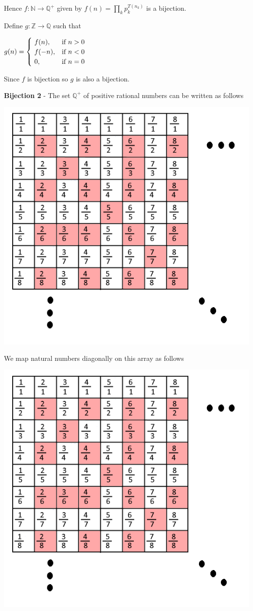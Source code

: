 \documentclass{article}
\begin{document}
    \qquad Hence $f: \mathbb{N}\rightarrow \mathbb{Q^+}$ given by $f(n)=\prod_{k}p_k^{T(n_k)}$ is a bijection.
    
    
    \qquad Define $g: \mathbb{Z} \rightarrow \mathbb{Q}$ such that
    
    \qquad $g(n)=
    \begin{cases}
        ~f(n), & \hbox{if $n>0$} \\
        ~f(-n), & \hbox{if $n<0$} \\
        ~0, & \hbox{if $n=0$}
    \end{cases}$
    
    \qquad Since $f$ is bijection so $g$ is also a bijection. 
                
    \quad \textbf{Bijection 2} - The set $\mathbb{Q^+}$ of positive rational numbers can be written as follows

    \begin{center}
    \includegraphics[width=3.5 in]{Images/a1-q4-1.png}
    \end{center}
    
    \quad We map natural numbers diagonally on this array as follows
    
    \begin{center}
    \includegraphics[width=3.5 in]{Images/a1-q4-1.png}
    \end{center}
    
\end{document}
